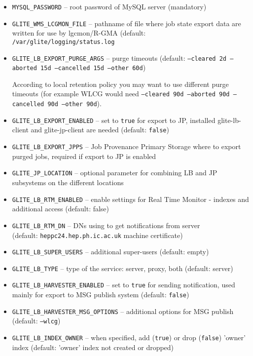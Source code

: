 \begin{itemize}
\item \texttt{MYSQL\_PASSWORD} -- root password of MySQL server (mandatory)
\item \texttt{GLITE\_WMS\_LCGMON\_FILE} -- pathname of file where job state
export data are written for use by lgcmon/R-GMA 
(default: \texttt{/var/glite/logging/status.log}
\item \texttt{GLITE\_LB\_EXPORT\_PURGE\_ARGS} -- purge timeouts (default: \texttt{--cleared 2d --aborted 15d --cancelled 15d --other 60d})

According to local retention policy you may want to use different purge timeouts (for example WLCG would need \texttt{--cleared 90d --aborted 90d --cancelled 90d --other 90d}).
\item \texttt{GLITE\_LB\_EXPORT\_ENABLED} -- set to \texttt{true} for export to JP, installed glite-lb-client and glite-jp-client are needed (default: \texttt{false})
\item \texttt{GLITE\_LB\_EXPORT\_JPPS} -- Job Provenance Primary Storage where to export purged jobs, required if export to JP is enabled
\item \texttt{GLITE\_JP\_LOCATION} -- optional parameter for combining LB and JP subsystems on the different locations
\item \texttt{GLITE\_LB\_RTM\_ENABLED} -- enable settings for Real Time Monitor - indexes and additional access (default: false)
\item \texttt{GLITE\_LB\_RTM\_DN} -- DNs using to get notifications from \LB server\\
(default: \texttt{heppc24.hep.ph.ic.ac.uk} machine certificate)
\item \texttt{GLITE\_LB\_SUPER\_USERS} -- additional super-users (default: empty)
\item \texttt{GLITE\_LB\_TYPE} -- type of the \LB service: server, proxy, both (default: server)
\item \texttt{GLITE\_LB\_HARVESTER\_ENABLED} -- set to \texttt{true} for sending notification, used mainly for export to MSG publish system (default: \texttt{false})
\item \texttt{GLITE\_LB\_HARVESTER\_MSG\_OPTIONS} -- additional options for MSG publish (default: \texttt{--wlcg})
\item \texttt{GLITE\_LB\_INDEX\_OWNER} -- when specified, add (\texttt{true}) or drop (\texttt{false}) 'owner' index (default: 'owner' index not created or dropped)
\end{itemize}

